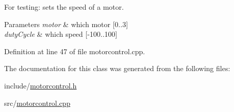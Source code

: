 \-For testing\-: sets the speed of a motor. 


\begin{DoxyParams}{\-Parameters}
{\em motor} & which motor \mbox{[}0..3\mbox{]} \\
\hline
{\em duty\-Cycle} & which speed \mbox{[}-\/100..100\mbox{]} \\
\hline
\end{DoxyParams}


\-Definition at line 47 of file motorcontrol.\-cpp.



\-The documentation for this class was generated from the following files\-:\begin{DoxyCompactItemize}
\item 
include/\hyperlink{motorcontrol_8h}{motorcontrol.\-h}\item 
src/\hyperlink{motorcontrol_8cpp}{motorcontrol.\-cpp}\end{DoxyCompactItemize}
